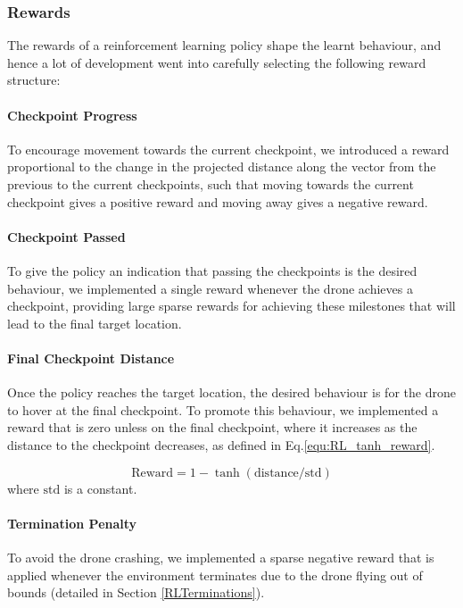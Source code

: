 \documentclass{report_template_oxford}
\begin{document}
\subsubsection{Rewards}
The rewards of a reinforcement learning policy shape the learnt behaviour, and hence a lot of development went into carefully selecting the following reward structure:

\paragraph{Checkpoint Progress} To encourage movement towards the current checkpoint, we introduced a reward proportional to the change in the projected distance along the vector from the previous to the current checkpoints, such that moving towards the current checkpoint gives a positive reward and moving away gives a negative reward.

\paragraph{Checkpoint Passed} To give the policy an indication that passing the checkpoints is the desired behaviour, we implemented a single reward whenever the drone achieves a checkpoint, providing large sparse rewards for achieving these milestones that will lead to the final target location.

\paragraph{Final Checkpoint Distance} Once the policy reaches the target location, the desired behaviour is for the drone to hover at the final checkpoint. To promote this behaviour, we implemented a reward that is zero unless on the final checkpoint, where it increases as the distance to the checkpoint decreases, as defined in Eq.\ref{equ:RL_tanh_reward}.

\begin{equation}
    \label{equ:RL_tanh_reward}
    \mathrm{Reward} = 1 - \tanh(\mathrm{distance/std})
\end{equation}
where $\mathrm{std}$ is a constant.

\paragraph{Termination Penalty} To avoid the drone crashing, we implemented a sparse negative reward that is applied whenever the environment terminates due to the drone flying out of bounds (detailed in Section \ref{RLTerminations}). 
\end{document}
